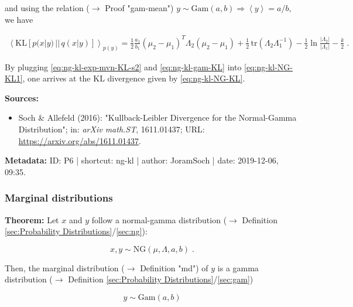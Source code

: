 \documentclass[a4paper,12pt]{book}
\begin{document}
and using the relation ($\rightarrow$ Proof "gam-mean") $y \sim \mathrm{Gam}(a,b) \Rightarrow \left\langle y \right\rangle = a/b$, we have

\begin{equation} \label{eq:ng-kl-exp-mvn-KL-s2}
\begin{split}
\left\langle \mathrm{KL}[p(x|y)\,||\,q(x|y)] \right\rangle_{p(y)} = \frac{1}{2} \frac{a_1}{b_1} (\mu_2 - \mu_1)^T \Lambda_2 (\mu_2 - \mu_1) + \frac{1}{2} \, \mathrm{tr}(\Lambda_2 \Lambda_1^{-1}) - \frac{1}{2} \ln \frac{|\Lambda_2|}{|\Lambda_1|} - \frac{k}{2} \; .
\end{split}
\end{equation}

By plugging \eqref{eq:ng-kl-exp-mvn-KL-s2} and \eqref{eq:ng-kl-gam-KL} into \eqref{eq:ng-kl-NG-KL1}, one arrives at the KL divergence given by \eqref{eq:ng-kl-NG-KL}.

\vspace{1em}
\textbf{Sources:}
\begin{itemize}
\item Soch \& Allefeld (2016): "Kullback-Leibler Divergence for the Normal-Gamma Distribution"; in: \textit{arXiv math.ST}, 1611.01437; URL: \url{https://arxiv.org/abs/1611.01437}.
\end{itemize}


\vspace{1em}
\textbf{Metadata:} ID: P6 | shortcut: ng-kl | author: JoramSoch | date: 2019-12-06, 09:35.


\subsubsection[\textbf{Marginal distributions}]{Marginal distributions} \label{sec:ng-marg}

\vspace{1em}
\textbf{Theorem:} Let $x$ and $y$ follow a normal-gamma distribution ($\rightarrow$ Definition \ref{sec:Probability Distributions}/\ref{sec:ng}):

\begin{equation} \label{eq:ng-marg-ng}
x,y \sim \mathrm{NG}(\mu, \Lambda, a, b) \; .
\end{equation}

Then, the marginal distribution ($\rightarrow$ Definition "md") of $y$ is a gamma distribution ($\rightarrow$ Definition \ref{sec:Probability Distributions}/\ref{sec:gam})

\begin{equation} \label{eq:ng-marg-ng-marg-y}
y \sim \mathrm{Gam}(a, b)
\end{equation}
\end{document}

